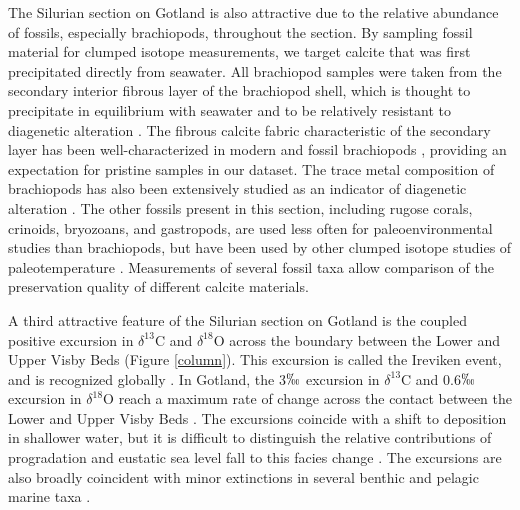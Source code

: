 \documentclass{article}
\newcommand{\deltao}{$\delta^{18}$}
\newcommand{\deltac}{$\delta^{13}$}
\begin{document}
The Silurian section on Gotland is also attractive due to the relative abundance of fossils, especially brachiopods, throughout the section. By sampling fossil material for clumped isotope measurements, we target calcite that was first precipitated directly from seawater. All brachiopod samples were taken from the secondary interior fibrous layer of the brachiopod shell, which is thought to precipitate in equilibrium with seawater and to be relatively resistant to diagenetic alteration \citep{Azmy1998,Samtleben2001}. The fibrous calcite fabric characteristic of the secondary layer has been well-characterized in modern and fossil brachiopods \citep{PerezHuerta2007,Samtleben2001,Schmahl2004}, providing an expectation for pristine samples in our dataset. The trace metal composition of brachiopods has also been extensively studied as an indicator of diagenetic alteration \citep{Azmy1998,Brand2003,Brand2012,Mii1994,Grossman1996,Shields2003}. The other fossils present in this section, including rugose corals, crinoids, bryozoans, and gastropods, are used less often for paleoenvironmental studies than brachiopods, but have been used by other clumped isotope studies of paleotemperature \citep{Came2007,Dennis2013,Finnegan2011}. Measurements of several fossil taxa allow comparison of the preservation quality of different calcite materials. 

A third attractive feature of the Silurian section on Gotland is the coupled positive excursion in \deltac C and \deltao O across the boundary between the Lower and Upper Visby Beds (Figure \ref{column}). This excursion is called the Ireviken event, and is recognized globally \citep{Munnecke2003}. In Gotland, the 3$\permil$ excursion in \deltac C and 0.6$\permil$ excursion in \deltao O reach a maximum rate of change across the contact between the Lower and Upper Visby Beds \citep{Munnecke2003}. The excursions coincide with a shift to deposition in shallower water, but it is difficult to distinguish the relative contributions of progradation and eustatic sea level fall to this facies change \citep{Calner2004a}. The excursions are also broadly coincident with minor extinctions in several benthic and pelagic marine taxa \citep{Munnecke2003}. 
\end{document}
